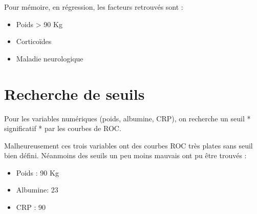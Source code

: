 \documentclass[]{article}
\providecommand{\tightlist}{%
  \setlength{\itemsep}{0pt}\setlength{\parskip}{0pt}}
\begin{document}
Pour mémoire, en régression, les facteurs retrouvés sont :

\begin{itemize}
\tightlist
\item
  Poids \textgreater{} 90 Kg
\item
  Corticoïdes
\item
  Maladie neurologique
\end{itemize}

\hypertarget{recherche-de-seuils}{%
\section{Recherche de seuils}\label{recherche-de-seuils}}

Pour les variables numériques (poids, albumine, CRP), on recherche un
seuil * significatif * par les courbes de ROC.

Malheureusement ces trois variables ont des courbes ROC très plates sans
seuil bien défini. Néanmoins des seuils un peu moins mauvais ont pu être
trouvés :

\begin{itemize}
\tightlist
\item
  Poids : 90 Kg
\item
  Albumine: 23
\item
  CRP : 90
\end{itemize}
\end{document}
